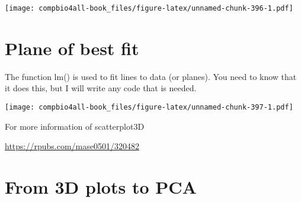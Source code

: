 \documentclass[
]{book}
\newenvironment{Shaded}{\begin{snugshade}}{\end{snugshade}}
\newcommand{\AttributeTok}[1]{\textcolor[rgb]{0.77,0.63,0.00}{#1}}
\newcommand{\CommentTok}[1]{\textcolor[rgb]{0.56,0.35,0.01}{\textit{#1}}}
\newcommand{\ConstantTok}[1]{\textcolor[rgb]{0.00,0.00,0.00}{#1}}
\newcommand{\DecValTok}[1]{\textcolor[rgb]{0.00,0.00,0.81}{#1}}
\newcommand{\DocumentationTok}[1]{\textcolor[rgb]{0.56,0.35,0.01}{\textbf{\textit{#1}}}}
\newcommand{\FunctionTok}[1]{\textcolor[rgb]{0.00,0.00,0.00}{#1}}
\newcommand{\NormalTok}[1]{#1}
\newcommand{\OtherTok}[1]{\textcolor[rgb]{0.56,0.35,0.01}{#1}}
\newcommand{\SpecialCharTok}[1]{\textcolor[rgb]{0.00,0.00,0.00}{#1}}
\begin{document}
\texttt{[image: compbio4all-book\_files/figure-latex/unnamed-chunk-396-1.pdf]}

\hypertarget{plane-of-best-fit}{%
\section{Plane of best fit}\label{plane-of-best-fit}}

The function lm() is used to fit lines to data (or planes). You need to know that it does this, but I will write any code that is needed.

\begin{Shaded}
\end{Shaded}

\texttt{[image: compbio4all-book\_files/figure-latex/unnamed-chunk-397-1.pdf]}

For more information of scatterplot3D

\url{https://rpubs.com/mase0501/320482}

\hypertarget{from-3d-plots-to-pca}{%
\section{From 3D plots to PCA}\label{from-3d-plots-to-pca}}
\end{document}
